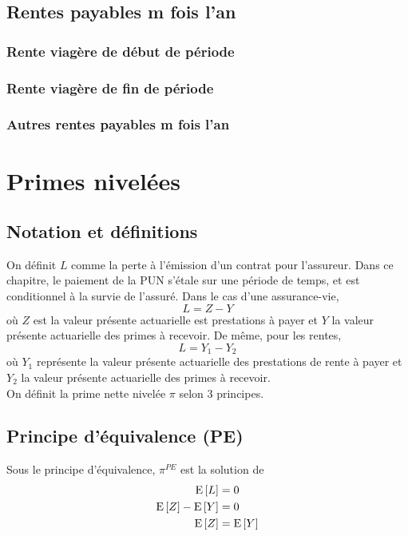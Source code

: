 \documentclass[10pt, french]{article}
\begin{document}
\begin{multicols*}{3}
\subsection*{Rentes payables m fois l'an}

\subsubsection*{\textcolor{amber(sae/ece)}{Rente viagère de début de période}}

\subsubsection*{\textcolor{amber(sae/ece)}{Rente viagère de fin de période}}

\subsubsection*{\textcolor{amber(sae/ece)}{Autres rentes payables m fois l'an}}


\section{Primes nivelées}
\subsection{Notation et définitions}
On définit $L$ comme la perte à l'émission d'un contrat pour l'assureur. Dans ce chapitre, le paiement de la PUN s'étale sur une période de temps, et est conditionnel  à la survie de l'assuré. Dans le cas d'une assurance-vie,
\[L = Z - Y\]
où $Z$ est la valeur présente actuarielle est prestations à payer et $Y$ la valeur présente actuarielle des primes à recevoir. De même, pour les rentes,
\[L = Y_1 - Y_2\]
où $Y_1$ représente la valeur présente actuarielle des prestations de rente à payer et $Y_2$ la valeur présente actuarielle des primes à recevoir. \\

On définit la prime nette nivelée $\pi$ selon 3 principes. 

\subsection{Principe d'équivalence (PE)}
Sous le principe d'équivalence, $\pi^{PE}$ est la solution de
\begin{align*}
\mathrm{E} \left[ L \right]	& = 0 \\
\mathrm{E} \left[ Z \right] - \mathrm{E} \left[ Y \right]	& = 0 \\
\mathrm{E} \left[ Z \right] & = \mathrm{E} \left[ Y \right] \\
\end{align*}



\end{multicols*}
\end{document}
